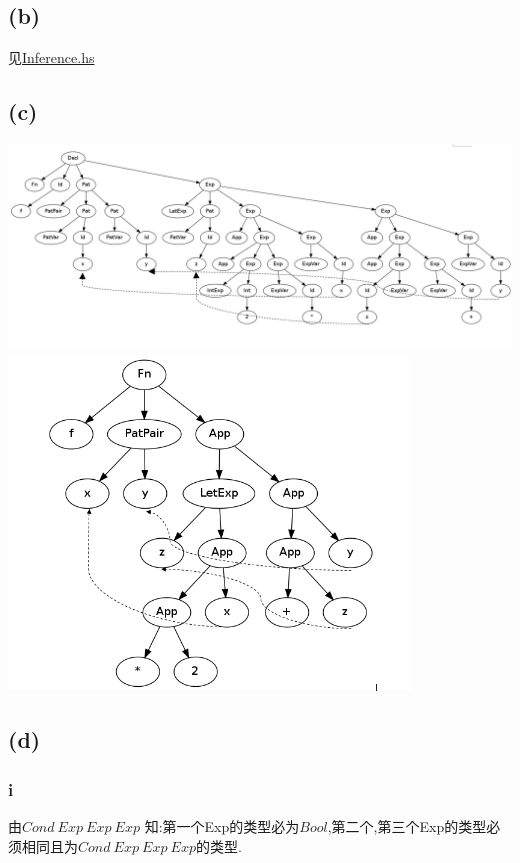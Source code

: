 \documentclass{paper}
\begin{document}
\subsection*{(b)} 见\href{./Inference.hs}{Inference.hs}
\subsection*{(c)}
	\begin{center}
	
		\includegraphics[width=1.3\textwidth]{./pro3_1.png}
		\includegraphics[width=0.8\textwidth]{./pro3_2.png}
	
	\end{center}
\subsection*{(d)}

	\subsubsection*{i}
		\begin{flushleft}	 
	 		由$Cond\ Exp\ Exp\ Exp$
			知:第一个Exp的类型必为$Bool$,第二个,第三个Exp的类型必须相同且为$Cond\ Exp\ Exp\ Exp$的类型.
	 	\end{flushleft}
\end{document}

